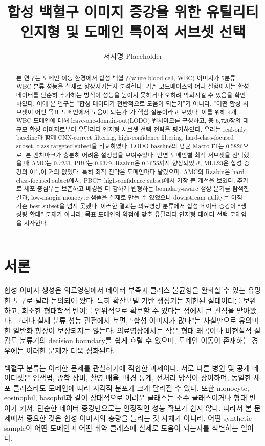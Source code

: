 \documentclass[11pt]{article}
\title{합성 백혈구 이미지 증강을 위한 유틸리티 인지형 및 도메인 특이적 서브셋 선택}
\author{저자명 Placeholder}
\date{}
\begin{document}
\maketitle

\begin{abstract}
본 연구는 도메인 이동 환경에서 합성 백혈구(white blood cell, WBC) 이미지가 5분류 WBC 분류 성능을 실제로 향상시키는지 분석한다. 기존 코드베이스의 여러 실험에서는 합성 데이터를 단순히 추가하는 방식이 성능을 높이지 못하거나 오히려 악화시킬 수 있음을 확인하였다. 이에 본 연구는 ``합성 데이터가 전반적으로 도움이 되는가''가 아니라, ``어떤 합성 서브셋이 어떤 목표 도메인에서 도움이 되는가''가 핵심 질문이라고 보았다. 이를 위해 4개 WBC 도메인에 대해 leave-one-domain-out(LODO) 벤치마크를 구성하고, 총 6,720장의 대규모 합성 이미지로부터 유틸리티 인지형 서브셋 선택 전략을 평가하였다. 우리는 real-only baseline과 함께 CNN-correct filtering, high-confidence filtering, hard-class-focused subset, class-targeted subset을 비교하였다. LODO baseline의 평균 Macro-F1는 0.5826으로, 본 벤치마크가 충분히 어려운 설정임을 보여주었다. 반면 도메인별 최적 서브셋을 선택했을 때 AMC는 0.7231, PBC는 0.6379, Raabin은 0.7655까지 향상되었고, MLL23은 합성 증강의 이득이 거의 없었다. 특히 최적 전략은 도메인마다 달랐으며, AMC와 Raabin은 hard-class-focused subset에서, PBC는 high-confidence subset에서 가장 큰 개선을 보였다. 추가로 세포 중심부는 보존하고 배경을 더 강하게 변형하는 boundary-aware 생성 분기를 탐색한 결과, low-margin monocyte 샘플을 실제로 만들 수 있었으나 downstream utility는 아직 기존 best subset을 넘지 못했다. 이러한 결과는 의료영상 분류에서 합성 데이터 증강이 ``생성량 확대'' 문제가 아니라, 목표 도메인의 약점에 맞춘 유틸리티 인지형 데이터 선택 문제임을 시사한다.
\end{abstract}

\section{서론}

합성 이미지 생성은 의료영상에서 데이터 부족과 클래스 불균형을 완화할 수 있는 유망한 도구로 널리 논의되어 왔다. 특히 확산모델 기반 생성기는 제한된 실데이터를 보완하고, 희소한 형태학적 변이를 인위적으로 확보할 수 있다는 점에서 큰 관심을 받아왔다. 그러나 실제 분류 성능 관점에서 보면, ``합성 이미지가 많다''는 사실만으로 유의미한 일반화 향상이 보장되지는 않는다. 의료영상에서는 작은 형태 왜곡이나 비현실적 질감도 분류기의 decision boundary를 쉽게 흐릴 수 있으며, 도메인 이동이 존재하는 경우에는 이러한 문제가 더욱 심화된다.

백혈구 분류는 이러한 문제를 관찰하기에 적합한 과제이다. 서로 다른 병원 및 공개 데이터셋은 염색법, 광학 장비, 촬영 배율, 배경 통계, 전처리 방식이 상이하며, 동일한 세포 클래스라도 도메인에 따라 시각적 분포가 크게 달라질 수 있다. 또한 monocyte, eosinophil, basophil과 같이 상대적으로 어려운 클래스는 소수 클래스이거나 형태 변이가 커서, 단순한 데이터 증강만으로는 안정적인 성능 확보가 쉽지 않다. 따라서 본 문제에서 중요한 것은 합성 이미지의 총량을 늘리는 것 자체가 아니라, 어떤 synthetic sample이 어떤 도메인과 어떤 취약 클래스에 실제로 도움이 되는지를 식별하는 일이다.
\end{document}
